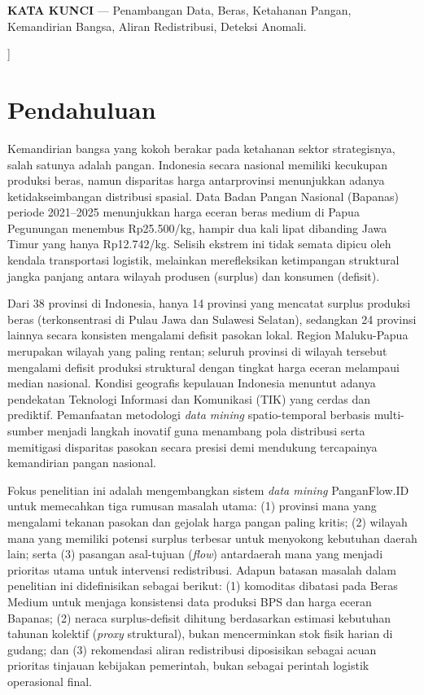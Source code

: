 \documentclass[journal, a4paper]{IEEEtran}
\begin{document}
\begin{@twocolumnfalse}
    \vspace{0.8em}
    \noindent\textbf{\sffamily KATA KUNCI} --- Penambangan Data, Beras, Ketahanan Pangan, Kemandirian Bangsa, Aliran Redistribusi, Deteksi Anomali.
    \vspace{2.0em}
  \end{@twocolumnfalse}
]


\section{Pendahuluan}
Kemandirian bangsa yang kokoh berakar pada ketahanan sektor strategisnya, salah satunya adalah pangan. Indonesia secara nasional memiliki kecukupan produksi beras, namun disparitas harga antarprovinsi menunjukkan adanya ketidakseimbangan distribusi spasial. Data Badan Pangan Nasional (Bapanas) periode 2021--2025 menunjukkan harga eceran beras medium di Papua Pegunungan menembus Rp25.500/kg, hampir dua kali lipat dibanding Jawa Timur yang hanya Rp12.742/kg. Selisih ekstrem ini tidak semata dipicu oleh kendala transportasi logistik, melainkan merefleksikan ketimpangan struktural jangka panjang antara wilayah produsen (surplus) dan konsumen (defisit).

Dari 38 provinsi di Indonesia, hanya 14 provinsi yang mencatat surplus produksi beras (terkonsentrasi di Pulau Jawa dan Sulawesi Selatan), sedangkan 24 provinsi lainnya secara konsisten mengalami defisit pasokan lokal. Region Maluku-Papua merupakan wilayah yang paling rentan; seluruh provinsi di wilayah tersebut mengalami defisit produksi struktural dengan tingkat harga eceran melampaui median nasional. Kondisi geografis kepulauan Indonesia menuntut adanya pendekatan Teknologi Informasi dan Komunikasi (TIK) yang cerdas dan prediktif. Pemanfaatan metodologi \textit{data mining} spatio-temporal berbasis multi-sumber menjadi langkah inovatif guna menambang pola distribusi serta memitigasi disparitas pasokan secara presisi demi mendukung tercapainya kemandirian pangan nasional.

Fokus penelitian ini adalah mengembangkan sistem \textit{data mining} PanganFlow.ID untuk memecahkan tiga rumusan masalah utama: (1) provinsi mana yang mengalami tekanan pasokan dan gejolak harga pangan paling kritis; (2) wilayah mana yang memiliki potensi surplus terbesar untuk menyokong kebutuhan daerah lain; serta (3) pasangan asal-tujuan (\textit{flow}) antardaerah mana yang menjadi prioritas utama untuk intervensi redistribusi. Adapun batasan masalah dalam penelitian ini didefinisikan sebagai berikut: (1) komoditas dibatasi pada Beras Medium untuk menjaga konsistensi data produksi BPS dan harga eceran Bapanas; (2) neraca surplus-defisit dihitung berdasarkan estimasi kebutuhan tahunan kolektif (\textit{proxy} struktural), bukan mencerminkan stok fisik harian di gudang; dan (3) rekomendasi aliran redistribusi diposisikan sebagai acuan prioritas tinjauan kebijakan pemerintah, bukan sebagai perintah logistik operasional final.
\end{document}
